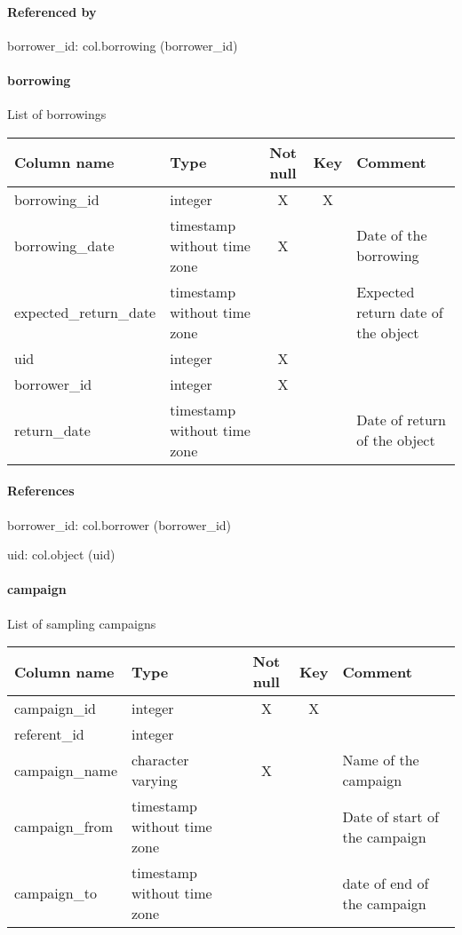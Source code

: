 \paragraph{Referenced by}
borrower\_id: col.borrowing (borrower\_id)

\paragraph{borrowing}
List of borrowings

\begin{tabular}{|l| p{2cm}|c|c| p{5cm}|}
\hline
Column name & Type & Not null & Key & Comment \\
\hline
borrowing\_id & integer & X & X & \\
borrowing\_date & timestamp without time zone & X &  & Date of the borrowing\\
expected\_return\_date & timestamp without time zone &  &  & Expected return date of the object\\
uid & integer & X &  & \\
borrower\_id & integer & X &  & \\
return\_date & timestamp without time zone &  &  & Date of return of the object\\
\hline
\end{tabular}
\paragraph{References}
borrower\_id: col.borrower (borrower\_id)

uid: col.object (uid)

\paragraph{campaign}
List of sampling campaigns

\begin{tabular}{|l| p{2cm}|c|c| p{5cm}|}
\hline
Column name & Type & Not null & Key & Comment \\
\hline
campaign\_id & integer & X & X & \\
referent\_id & integer &  &  & \\
campaign\_name & character varying & X &  & Name of the campaign\\
campaign\_from & timestamp without time zone &  &  & Date of start of the campaign\\
campaign\_to & timestamp without time zone &  &  & date of end of the campaign\\
\hline
\end{tabular}

